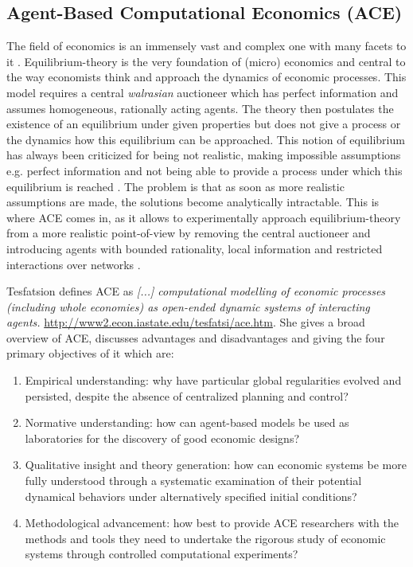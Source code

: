 \subsection{Agent-Based Computational Economics (ACE)}
The field of economics is an immensely vast and complex one with many facets to it \cite{bowles_understanding_2005}. Equilibrium-theory is the very foundation of (micro) economics \cite{colell_microeconomic_1995} and central to the way economists think and approach the dynamics of economic processes. This model requires a central \textit{walrasian} auctioneer which has perfect information and assumes homogeneous, rationally acting agents. The theory then postulates the existence of an equilibrium under given properties but does not give a process or the dynamics how this equilibrium can be approached. 
This notion of equilibrium has always been criticized for being not realistic, making impossible assumptions e.g. perfect information and not being able to provide a process under which this equilibrium is reached \cite{kirman_complex_2010}. The problem is that as soon as more realistic assumptions are made, the solutions become analytically intractable. This is where ACE comes in, as it allows to experimentally approach equilibrium-theory from a more realistic point-of-view by removing the central auctioneer and introducing agents with bounded rationality, local information and restricted interactions over networks \cite{farmer_economy_2009}. 

Tesfatsion defines ACE as \textit{[...] computational modelling of economic processes (including whole economies) as open-ended dynamic systems of interacting agents.} \url{http://www2.econ.iastate.edu/tesfatsi/ace.htm}. She gives a broad overview \cite{tesfatsion_agent-based_2006} of ACE, discusses advantages and disadvantages and giving the four primary objectives of it which are:

\begin{enumerate}
	\item Empirical understanding: why have particular global regularities evolved and persisted, despite the absence of centralized planning and control?
	\item Normative understanding: how can agent-based models be used as laboratories for the discovery of good economic designs?
	\item Qualitative insight and theory generation: how can economic systems be more fully understood through a systematic examination of their potential dynamical behaviors under alternatively specified initial conditions?
	\item Methodological advancement: how best to provide ACE researchers with the methods and tools they need to undertake the rigorous study of economic systems through controlled computational experiments?
\end{enumerate}

